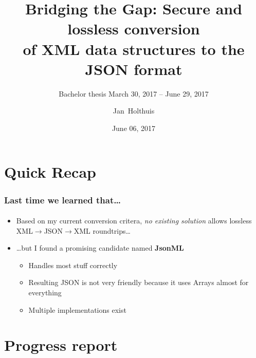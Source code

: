 \documentclass[
    alternativetitlepage=alternativ,
    cornerlogo=hgi_nds_logo2,
    sectionoverview,
]{rubpresentation}
\title[XML/JSON conversions]
{Bridging the Gap: Secure and lossless conversion\\ of XML data structures to the JSON format}
\subtitle{\small Bachelor thesis \hspace{3mm}{\scriptsize $\blacksquare$}\hspace{3mm} March 30, 2017 -- June 29, 2017}
\author[Holthuis]{Jan~Holthuis}
\institute[Advisors]
{%
Advisors: Dennis Felsch \& Paul Rösler
}
\date{June 06, 2017}
\begin{document}
\frame[plain]{\titlepage}




\section{Quick Recap}

\begin{frame}
    \frametitle{Last time we learned that\dots{}}
    \framesubtitle{}
    \begin{itemize}
        \item{} Based on my current conversion critera, \emph{no existing solution} allows lossless XML$\rightarrow$JSON$\rightarrow$XML roundtrips\dots{}
        \item{} \dots{}but I found a promising candidate named \textbf{JsonML}
        \begin{itemize}
            \item{} Handles most stuff correctly
            \item{} Resulting JSON is not very friendly because it uses Arrays almost for everything
            \item{} Multiple implementations exist
        \end{itemize}
    \end{itemize}
\end{frame}


\section{Progress report}
\end{document}

